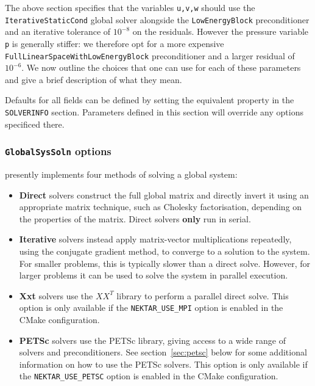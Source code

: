 The above section specifies that the variables \texttt{u,v,w} should use the
\texttt{IterativeStaticCond} global solver alongside the \texttt{LowEnergyBlock}
preconditioner and an iterative tolerance of $10^{-8}$ on the residuals. However
the pressure variable \texttt{p} is generally stiffer: we therefore opt for a
more expensive \texttt{FullLinearSpaceWithLowEnergyBlock} preconditioner and a
larger residual of $10^{-6}$. We now outline the choices that one can use for
each of these parameters and give a brief description of what they mean.

\begin{notebox}
  Defaults for all fields can be defined by setting the equivalent property in
  the \texttt{SOLVERINFO} section. Parameters defined in this section will
  override any options specificed there.
\end{notebox}

\subsubsection{\texttt{GlobalSysSoln} options}

\nekpp presently implements four methods of solving a global system:

\begin{itemize}
  \item \textbf{Direct} solvers construct the full global matrix and directly
  invert it using an appropriate matrix technique, such as Cholesky
  factorisation, depending on the properties of the matrix. Direct solvers
  \textbf{only} run in serial.
  \item \textbf{Iterative} solvers instead apply matrix-vector multiplications
  repeatedly, using the conjugate gradient method, to converge to a solution to
  the system. For smaller problems, this is typically slower than a direct
  solve. However, for larger problems it can be used to solve the system in
  parallel execution.
  \item \textbf{Xxt} solvers use the $XX^T$ library to perform a parallel direct
  solve. This option is only available if the \texttt{NEKTAR\_USE\_MPI} option
  is enabled in the CMake configuration.
  \item \textbf{PETSc} solvers use the PETSc library, giving access to a wide
  range of solvers and preconditioners. See section~\ref{sec:petsc} below for
  some additional information on how to use the PETSc solvers. This option is
  only available if the \texttt{NEKTAR\_USE\_PETSC} option is enabled in the
  CMake configuration.
\end{itemize}

